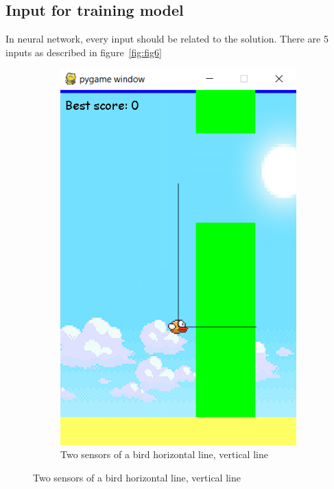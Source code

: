 \documentclass[conference]{IEEEtran}
\begin{document}
\subsection{Input for training model}
In neural network, every input should be related to the solution. There are 5 inputs as described in figure~\ref{fig:fig6}\\
\begin{figure}[H]
    \centering
    \begin{subfigure}[b]{0.2\textwidth}
        \includegraphics[width=\textwidth]{sensor}
        \caption{Two sensors of a bird horizontal line, vertical line}
        \label{fig:fig7}
    \end{subfigure}

\end{figure}
\end{document}
